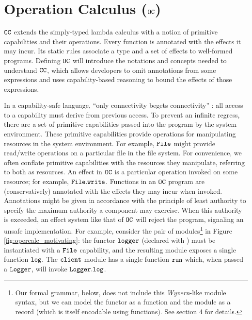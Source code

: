 \section{Operation Calculus ($\mathtt{OC}$)}

$\mathtt{OC}$ extends the simply-typed lambda calculus with a notion of primitive capabilities and their operations.
Every function is annotated with the effects it may incur.
Its static rules associate a type and a set of effects to well-formed programs.
Defining $\mathtt{OC}$ will introduce the notations and concepts needed to understand $\mathtt{CC}$, which allows developers to omit annotations from some expressions and uses capability-based reasoning to bound the effects of those expressions.

In a capability-safe language, ``only connectivity begets connectivity'' \cite{miller06}: all access to a capability must derive from previous access.
To prevent an infinite regress, there are a set of primitive capabilities passed into the program by the system environment.
These primitive capabilities provide operations for manipulating resources in the system environment.
For example, $\mathtt{File}$ might provide read/write operations on a particular file in the file system.
For convenience, we often conflate primitive capabilities with the resources they manipulate, referring to both as resources.
An effect in $\mathtt{OC}$ is a particular operation invoked on some resource; for example, $\mathtt{File.write}$.
Functions in an $\mathtt{OC}$ program are (conservatively) annotated with the effects they may incur when invoked. Annotations might be given in accordance with the principle of least authority to specify the maximum authority a component may exercise.
When this authority is exceeded, an effect system like that of $\mathtt{OC}$ will reject the program, signaling an unsafe implementation.
For example, consider the pair of modules\footnote{Our formal grammar, below, does not include this \textit{Wyvern}-like module syntax, but we can model the  functor as a function and the  module as a record (which is itself encodable using functions).  See section 4 for details.} in Figure \ref{fig:opercalc_motivating}: the functor $\mathtt{logger}$ (declared with  ) must be instantiated with a $\mathtt{File}$ capability, and the resulting module exposes a single function $\mathtt{log}$.
The $\mathtt{client}$ module has a single function $\mathtt{run}$ which, when passed a $\mathtt{Logger}$, will invoke $\mathtt{Logger.log}$.

